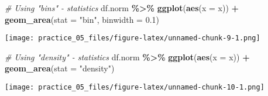 \documentclass[
]{article}
\newenvironment{Shaded}{\begin{snugshade}}{\end{snugshade}}
\newcommand{\AttributeTok}[1]{\textcolor[rgb]{0.13,0.29,0.53}{#1}}
\newcommand{\CommentTok}[1]{\textcolor[rgb]{0.56,0.35,0.01}{\textit{#1}}}
\newcommand{\FloatTok}[1]{\textcolor[rgb]{0.00,0.00,0.81}{#1}}
\newcommand{\FunctionTok}[1]{\textcolor[rgb]{0.13,0.29,0.53}{\textbf{#1}}}
\newcommand{\NormalTok}[1]{#1}
\newcommand{\SpecialCharTok}[1]{\textcolor[rgb]{0.81,0.36,0.00}{\textbf{#1}}}
\newcommand{\StringTok}[1]{\textcolor[rgb]{0.31,0.60,0.02}{#1}}
\begin{document}
\begin{Shaded}
\begin{Highlighting}[]
\CommentTok{\#   Using "bins" {-} statistics}
\NormalTok{df.norm }\SpecialCharTok{\%\textgreater{}\%} 
  \FunctionTok{ggplot}\NormalTok{(}\FunctionTok{aes}\NormalTok{(}\AttributeTok{x =}\NormalTok{ x)) }\SpecialCharTok{+}
  \FunctionTok{geom\_area}\NormalTok{(}\AttributeTok{stat =} \StringTok{"bin"}\NormalTok{, }
            \AttributeTok{binwidth =} \FloatTok{0.1}\NormalTok{)}
\end{Highlighting}
\end{Shaded}

\texttt{[image: practice\_05\_files/figure-latex/unnamed-chunk-9-1.png]}

\begin{Shaded}
\begin{Highlighting}[]
\CommentTok{\#   Using "density" {-} statistics}
\NormalTok{df.norm }\SpecialCharTok{\%\textgreater{}\%} 
  \FunctionTok{ggplot}\NormalTok{(}\FunctionTok{aes}\NormalTok{(}\AttributeTok{x =}\NormalTok{ x)) }\SpecialCharTok{+}
  \FunctionTok{geom\_area}\NormalTok{(}\AttributeTok{stat =} \StringTok{"density"}\NormalTok{)}
\end{Highlighting}
\end{Shaded}

\texttt{[image: practice\_05\_files/figure-latex/unnamed-chunk-10-1.png]}
\end{document}
